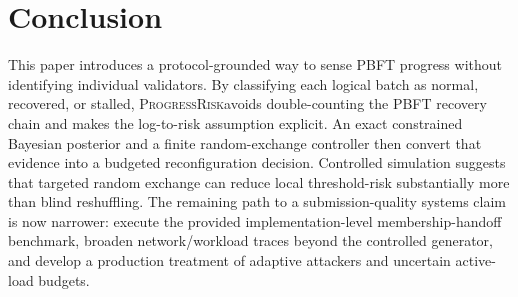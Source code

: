 \documentclass[10pt,conference]{IEEEtran}
\newcommand{\sysname}{\textsc{ProgressRisk}}
\begin{document}
\section{Conclusion}

This paper introduces a protocol-grounded way to sense PBFT progress without identifying individual validators. By classifying each logical batch as normal, recovered, or stalled, \sysname avoids double-counting the PBFT recovery chain and makes the log-to-risk assumption explicit. An exact constrained Bayesian posterior and a finite random-exchange controller then convert that evidence into a budgeted reconfiguration decision. Controlled simulation suggests that targeted random exchange can reduce local threshold-risk substantially more than blind reshuffling. The remaining path to a submission-quality systems claim is now narrower: execute the provided implementation-level membership-handoff benchmark, broaden network/workload traces beyond the controlled generator, and develop a production treatment of adaptive attackers and uncertain active-load budgets.
\end{document}
